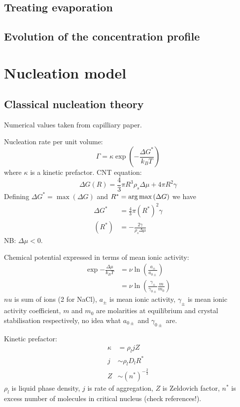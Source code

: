 \documentclass[12pt]{report}
\begin{document}
\subsection{Treating evaporation}
\subsection{Evolution of the concentration profile}

\section{Nucleation model}
\subsection{Classical nucleation theory}

Numerical values taken from capilliary paper.

Nucleation rate per unit volume:
\begin{equation}
  \Gamma = \kappa \exp{\left(-\frac{\Delta G^{*}}{k_B T}\right)}
\end{equation}
where $\kappa$ is a kinetic prefactor.
CNT equation:
\begin{equation}
  \Delta G(R) = \frac{4}{3} \pi R^3 \rho_s \Delta \mu + 4\pi R^2 \gamma
\end{equation}
Defining $\Delta G^{*} = \max{(\Delta G)}$ and $R^{*} = \operatorname*{arg\,max}{(\Delta G)}$ we have
\begin{align}
  \Delta G^{*} &= \frac{4}{3} \pi (R^{*})^2 \gamma \\
  (R^{*}) &= -\frac{2\gamma}{\rho_s \Delta\mu}
\end{align}
NB: $\Delta \mu < 0$.

Chemical potential expressed in terms of mean ionic activity:
\begin{equation}
  \begin{aligned}
  \exp{-\frac{\Delta \mu}{k_B T}} &=
  \nu \ln{\left( \frac{a_\pm}{a_{0\pm}} \right)} \\
  &=
  \nu \ln{\left( \frac{\gamma_\pm}{\gamma_{0\pm}} \frac{m}{m_0} \right)}
  \end{aligned}
\end{equation}
$nu$ is sum of ions (2 for NaCl), $a_\pm$ is mean ionic activity, $\gamma_\pm$ is mean ionic activity coefficient, $m$ and $m_0$ are molarities at equilibrium and crystal stabilisation respectively, no idea what $a_{0\pm}$ and $\gamma_{0\pm}$ are.

Kinetic prefactor:
\begin{align}
  \kappa &= \rho_l j Z \\
  j &\sim \rho_l D_l R^* \\
  Z &\sim (n^*)^{-\tfrac{2}{3}}
\end{align}
$\rho_l$ is liquid phase density, $j$ is rate of aggregation, $Z$ is Zeldovich factor, $n^*$ is excess number of molecules in critical nucleus (check references!).
\end{document}
